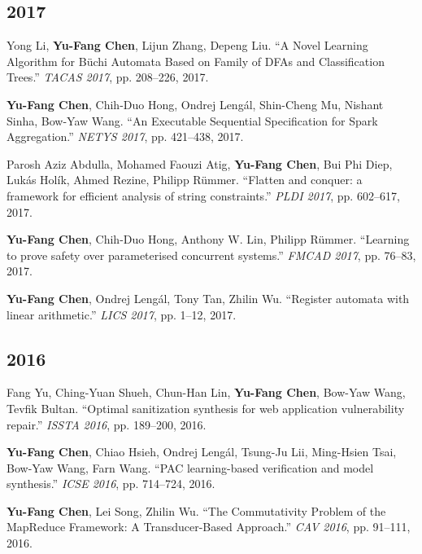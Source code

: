 \documentclass[10.5pt,a4paper]{article}
\begin{document}
\subsection*{2017}
\begin{enumerate}[leftmargin=*,label={[\arabic*]},resume]
\item Yong Li, \textbf{Yu-Fang Chen}, Lijun Zhang, Depeng Liu. ``A Novel Learning Algorithm for Büchi Automata Based on Family of DFAs and Classification Trees.'' \emph{TACAS 2017}, pp. 208--226, 2017.
\item \textbf{Yu-Fang Chen}, Chih-Duo Hong, Ondrej Lengál, Shin-Cheng Mu, Nishant Sinha, Bow-Yaw Wang. ``An Executable Sequential Specification for Spark Aggregation.'' \emph{NETYS 2017}, pp. 421--438, 2017.
\item Parosh Aziz Abdulla, Mohamed Faouzi Atig, \textbf{Yu-Fang Chen}, Bui Phi Diep, Lukás Holík, Ahmed Rezine, Philipp Rümmer. ``Flatten and conquer: a framework for efficient analysis of string constraints.'' \emph{PLDI 2017}, pp. 602--617, 2017.
\item \textbf{Yu-Fang Chen}, Chih-Duo Hong, Anthony W. Lin, Philipp Rümmer. ``Learning to prove safety over parameterised concurrent systems.'' \emph{FMCAD 2017}, pp. 76--83, 2017.
\item \textbf{Yu-Fang Chen}, Ondrej Lengál, Tony Tan, Zhilin Wu. ``Register automata with linear arithmetic.'' \emph{LICS 2017}, pp. 1--12, 2017.
\end{enumerate}
\subsection*{2016}
\begin{enumerate}[leftmargin=*,label={[\arabic*]},resume]
\item Fang Yu, Ching-Yuan Shueh, Chun-Han Lin, \textbf{Yu-Fang Chen}, Bow-Yaw Wang, Tevfik Bultan. ``Optimal sanitization synthesis for web application vulnerability repair.'' \emph{ISSTA 2016}, pp. 189--200, 2016.
\item \textbf{Yu-Fang Chen}, Chiao Hsieh, Ondrej Lengál, Tsung-Ju Lii, Ming-Hsien Tsai, Bow-Yaw Wang, Farn Wang. ``PAC learning-based verification and model synthesis.'' \emph{ICSE 2016}, pp. 714--724, 2016.
\item \textbf{Yu-Fang Chen}, Lei Song, Zhilin Wu. ``The Commutativity Problem of the MapReduce Framework: A Transducer-Based Approach.'' \emph{CAV 2016}, pp. 91--111, 2016.
\end{enumerate}
\end{document}
